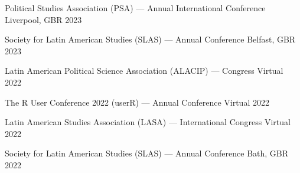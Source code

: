 \begin{cvhonors}
\cvconf
{Political Studies Association (PSA) --- Annual International Conference} 
{Liverpool, GBR}
{2023}
\end{cvhonors}

\begin{cvhonors}
\cvconf
{Society for Latin American Studies (SLAS) --- Annual Conference} 
{Belfast, GBR}
{2023}
\end{cvhonors}




\begin{cvhonors}
\cvconf
{Latin American Political Science Association (ALACIP) --- Congress} 
{Virtual}
{2022}
\end{cvhonors}


\begin{cvhonors}
\cvconf
{The R User Conference 2022 (userR) --- Annual Conference} 
{Virtual}
{2022}
\end{cvhonors}

\begin{cvhonors}
\cvconf
{Latin American Studies Association (LASA) --- International Congress} 
{Virtual}
{2022}
\end{cvhonors}

\begin{cvhonors}
\cvconf
{Society for Latin American Studies (SLAS) --- Annual Conference} 
{Bath, GBR}
{2022}
\end{cvhonors}




